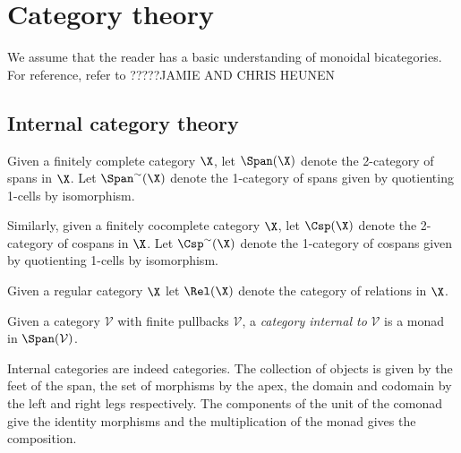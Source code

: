 
\section{Category theory}





We assume that the reader has a basic understanding of monoidal bicategories.  For reference, refer to ?????JAMIE AND CHRIS HEUNEN


\subsection{Internal category theory}

%
%
%
%
%
%
%

\begin{definition}
Given a finitely complete category $\X$, let $\Span(\X)$ denote the 2-category of spans in $\X$.  Let $\Span^\sim(\X)$ denote the 1-category of spans given by quotienting 1-cells by isomorphism.

Similarly, given a finitely cocomplete category $\X$, let $\Csp(\X)$ denote the 2-category of cospans in $\X$.  Let $\Csp^\sim(\X)$ denote the 1-category of cospans given by quotienting 1-cells by isomorphism.

Given a regular category $\X$ let $\Rel(\X)$ denote the category of relations in $\X$.
\end{definition}



\begin{definition}
\label{def:internalcat}

Given a category $\mathcal V$ with finite pullbacks $\mathcal V$, a {\it category internal to} $\mathcal V$ is a monad in $\Span(\mathcal V)$.
\end{definition}

Internal categories are indeed categories.  The collection of objects is given by the feet of the span, the set of morphisms by the apex, the domain and codomain by the left and right legs respectively.  The components of the unit of the comonad give the identity morphisms and the multiplication of the monad gives the composition.

